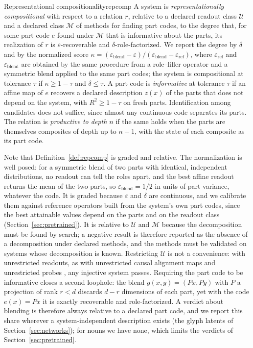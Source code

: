 \documentclass[10pt]{article}
\theoremstyle{plain}
\theoremstyle{remark}
\newcommand{\U}{\mathcal{U}}
\newcommand{\M}{\mathcal{M}}
\begin{document}
\begin{defbox}{Representational compositionality}{repcomp}
A system is \emph{representationally compositional} with respect to a relation $r$, relative to a declared readout class $\U$ and a declared class $\M$ of methods for finding part codes, to the degree that, for some part code $e$ found under $\M$ that is informative about the parts, its realization of $r$ is $\varepsilon$-recoverable and $\delta$-role-factorized. We report the degree by $\delta$ and by the normalized score $\kappa = (\varepsilon_{\mathrm{blend}} - \varepsilon)/(\varepsilon_{\mathrm{blend}} - \varepsilon_{\mathrm{ref}})$, where $\varepsilon_{\mathrm{ref}}$ and $\varepsilon_{\mathrm{blend}}$ are obtained by the same procedure from a role--filler operator and a symmetric blend applied to the same part codes; the system is compositional at tolerance $\tau$ if $\kappa \ge 1 - \tau$ and $\delta \le \tau$. A part code is \emph{informative} at tolerance $\tau$ if an affine map of $e$ recovers a declared description $z(x)$ of the parts that does not depend on the system, with $R^2 \ge 1 - \tau$ on fresh parts. Identification among candidates does not suffice, since almost any continuous code separates its parts. The relation is \emph{productive to depth $n$} if the same holds when the parts are themselves composites of depth up to $n - 1$, with the state of each composite as its part code.
\end{defbox}

Note that Definition~\ref{def:repcomp} is graded and relative. The normalization is well posed: for a symmetric blend of two parts with identical, independent distributions, no readout can tell the roles apart, and the best affine readout returns the mean of the two parts, so $\varepsilon_{\mathrm{blend}} = 1/2$ in units of part variance, whatever the code. It is graded because $\varepsilon$ and $\delta$ are continuous, and we calibrate them against reference operators built from the system's own part codes, since the best attainable values depend on the parts and on the readout class (Section~\ref{sec:pretrained}). It is relative to $\U$ and $\M$ because the decomposition must be found by search; a negative result is therefore reported as the absence of a decomposition under declared methods, and the methods must be validated on systems whose decomposition is known. Restricting $\U$ is not a convenience: with unrestricted readouts, as with unrestricted causal alignment maps \citep{sutter2025} and unrestricted probes \citep{hewitt2019}, any injective system passes. Requiring the part code to be informative closes a second loophole: the blend $g(x, y) = (Px, Py)$ with $P$ a projection of rank $r < d$ discards $d - r$ dimensions of each part, yet with the code $e(x) = Px$ it is exactly recoverable and role-factorized. A verdict about blending is therefore always relative to a declared part code, and we report this share wherever a system-independent description exists (the glyph latents of Section~\ref{sec:networks}); for nouns we have none, which limits the verdicts of Section~\ref{sec:pretrained}.
\end{document}
